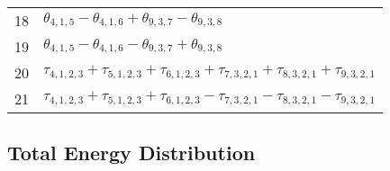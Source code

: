 \documentclass[10pt,oneside]{article}
\begin{document}
\begin{table}[h!]
\begin{tabular}{ll}
  18  & $\theta_{4,1,5} - \theta_{4,1,6} + \theta_{9,3,7} - \theta_{9,3,8}$ \\
  19  & $\theta_{4,1,5} - \theta_{4,1,6} - \theta_{9,3,7} + \theta_{9,3,8}$ \\
  20  & $\tau_{4,1,2,3} + \tau_{5,1,2,3} + \tau_{6,1,2,3} + \tau_{7,3,2,1} + \tau_{8,3,2,1} + \tau_{9,3,2,1}$ \\
  21  & $\tau_{4,1,2,3} + \tau_{5,1,2,3} + \tau_{6,1,2,3} - \tau_{7,3,2,1} - \tau_{8,3,2,1} - \tau_{9,3,2,1}$ \\
\bottomrule
\end{tabular}
\end{table}

\begin{table}
\subsection*{Total Energy Distribution}
\centering\end{table}

\clearpage

\subsection{}
\end{document}
